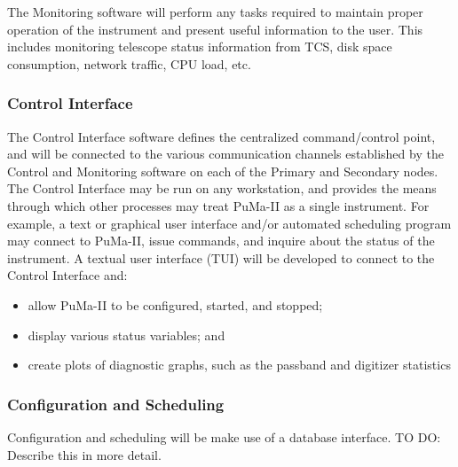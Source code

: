 The Monitoring software will perform any tasks required to maintain
proper operation of the instrument and present useful information to
the user.  This includes monitoring telescope status information from
TCS, disk space consumption, network traffic, CPU load, etc.

\subsubsection{Control Interface}

The Control Interface software defines the centralized command/control
point, and will be connected to the various communication channels
established by the Control and Monitoring software on each of the
Primary and Secondary nodes.  The Control Interface may be run on any
workstation, and provides the means through which other processes may
treat PuMa-II as a single instrument.  For example, a text or
graphical user interface and/or automated scheduling program may
connect to PuMa-II, issue commands, and inquire about the status of
the instrument.  A textual user interface (TUI) will be developed to
connect to the Control Interface and:
\begin{itemize}
\item allow PuMa-II to be configured, started, and stopped;
\vspace{-2mm}
\item display various status variables; and
\vspace{-2mm}
\item create plots of diagnostic graphs, 
      such as the passband and digitizer statistics
\end{itemize}

\subsubsection{Configuration and Scheduling}

Configuration and scheduling will be make use of a database interface.
TO DO: Describe this in more detail.

